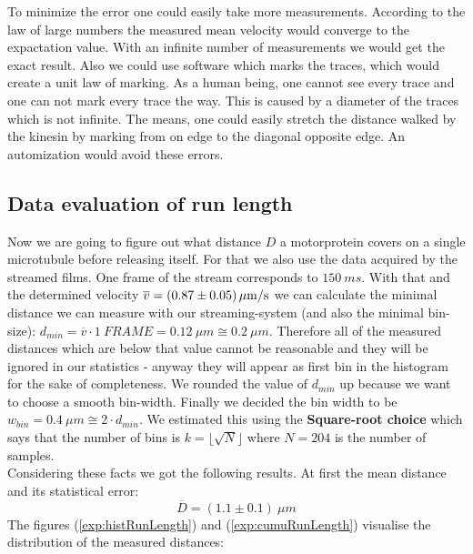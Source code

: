                 \label{velodist}
                \vspace{2mm}
        To minimize the error one could easily take more measurements. According to the law of large numbers the measured mean velocity would converge to the expactation value. With an infinite number of measurements we would get the exact result. 
        Also we could use software which marks the traces, which would create a unit law of marking. As a human being, one cannot see every trace and one can not mark every trace the way. This is caused by a diameter of the traces which is not infinite. The means, one could easily stretch the distance walked by the kinesin by marking from on edge to the diagonal opposite edge. An automization would avoid these errors. 
    
    \subsection{Data evaluation of run length}
    	Now we are going to figure out what distance $D$ a motorprotein covers on a single microtubule before releasing itself. For that we also use the data acquired by the streamed films. One frame of the stream corresponds to $150\ \unit{ms}$. With that and the determined velocity $\overline v = \unit[(0.87 \pm 0.05)]{\mu m/s}$ we can calculate the minimal distance we can measure with our streaming-system (and also the minimal bin-size): $d_{min} = \overline{v} \cdot 1\ \unit{FRAME} = 0.12\ \unit{\mu m} \cong 0.2\ \unit{\mu m}$. Therefore all of the measured distances which are below that value cannot be reasonable and they will be ignored in our statistics - anyway they will appear as first bin in the histogram for the sake of completeness. We rounded the value of $d_{min}$ up because we want to choose a smooth bin-width. Finally we decided the bin width to be $w_{bin} = 0.4\ \unit{\mu m} \cong 2 \cdot {d_{min}}$. We estimated this using the \textbf{Square-root choice}\cite{wikiHisto} which says that the number of bins is $k = \lfloor\sqrt{N}\rfloor$ where $N = 204$ is the number of samples.\\
    	Considering these facts we got the following results. At first the mean distance and its statistical error:
    	\begin{equation*}
    		\overline{D} = (1.1 \pm 0.1)\ \unit{\mu m}
    	\end{equation*}
    	The figures (\ref{exp:histRunLength}) and  (\ref{exp:cumuRunLength}) visualise the distribution of the measured distances:
    	 \minipanf
